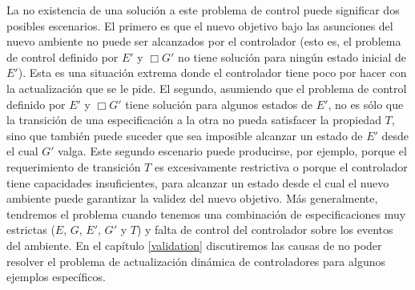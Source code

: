 La no existencia de una solución a este problema de control puede significar dos posibles escenarios. El primero es que
el nuevo objetivo bajo las asunciones del nuevo ambiente no puede ser alcanzados por el controlador (esto es, el
problema de control definido por $E'$ y $\Box G'$ no tiene solución para ningún estado inicial de $E'$). Esta es una
situación extrema donde el controlador tiene poco por hacer con la actualización que se le pide. El segundo, asumiendo
que el problema de control definido por $E'$ y $\Box G'$ tiene solución para algunos estados de $E'$, no es sólo que la
transición de una especificación a la otra no pueda satisfacer la propiedad $T$, sino que también puede suceder que sea
imposible alcanzar un estado de $E'$ desde el cual $G'$ valga. Este segundo escenario puede producirse, por ejemplo,
porque el requerimiento de transición $T$ es excesivamente restrictiva o porque el controlador tiene capacidades
insuficientes, para alcanzar un estado desde el cual el nuevo ambiente puede garantizar la validez del nuevo
objetivo. Más generalmente, tendremos el problema cuando tenemos una combinación de especificaciones muy estrictas ($E$,
$G$, $E'$, $G'$ y $T$) y falta de control del controlador sobre los eventos del ambiente. En el capítulo \ref{validation}
discutiremos las causas de no poder resolver el problema de actualización dinámica de controladores para algunos
ejemplos específicos.
